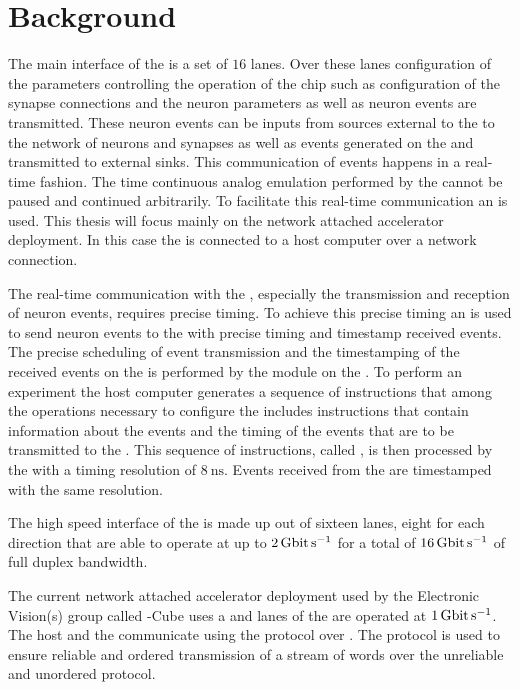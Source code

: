 \section{Background}
The main interface of the \HICANNX{} \ASIC{} is a set of $\num{16}$ \LVDS{} lanes. Over these \LVDS{} lanes configuration of the parameters controlling the operation of the chip such as configuration of the synapse connections and the neuron parameters as well as neuron events are transmitted. These neuron events can be inputs from sources external to the \ASIC{} to the network of neurons and synapses as well as events generated on the \ASIC{} and transmitted to external sinks.
This communication of events happens in a real-time fashion. The time continuous analog emulation performed by the \ASIC{} cannot be paused and continued arbitrarily. To facilitate this real-time communication  an \FPGA{} is used. This thesis will focus mainly on the network attached accelerator deployment. In this case the \FPGA{} is connected to a host computer over a network connection.

The real-time communication with the \ASIC{}, especially the transmission and reception of neuron events, requires precise timing\autocite{ref:precise_timing}.
To achieve this precise timing  an \FPGA{} is used to send neuron events to the \ASIC{} with precise timing and timestamp received events. The precise scheduling of event transmission and the timestamping of the received events on the \FPGA{} is performed by the \pbexec{} module on the \FPGA{}.
To perform an experiment the host computer generates a sequence of instructions that among the operations necessary to configure the \ASIC{} includes instructions that contain information about the events and the timing of the events that are to be transmitted to the \ASIC{}. This sequence of instructions, called \PlaybackProgram{}, is then processed by the \pbexec{} with a timing resolution of $\SI{8}{\nano\second}$.
Events received from the \ASIC{} are timestamped with the same resolution.

The high speed interface of the \ASIC{} is made up out of sixteen \LVDS{} lanes, eight for each direction that are able to operate at up to $\SI{2}{\giga\bit\per\second}$ for a total of $\SI{16}{\giga\bit\per\second}$ of full duplex bandwidth.

The current network attached accelerator deployment used by the Electronic Vision(s) group called \BSSTwo{}-Cube\autocite{ref:bss_cube} uses a \Xilinx{}  \FPGA{} and \LVDS{} lanes of the \ASIC{} are operated at $\SI{1}{\giga\bit\per\second}$. The host and the \FPGA{} communicate using the \UDP{} protocol over \Gigabitethernet{}. The \HostARQ{}\autocite{ref:hostarq} protocol is used to ensure reliable and ordered transmission of a stream of \PhyWordSize{} words over the unreliable and unordered \UDP{} protocol.

